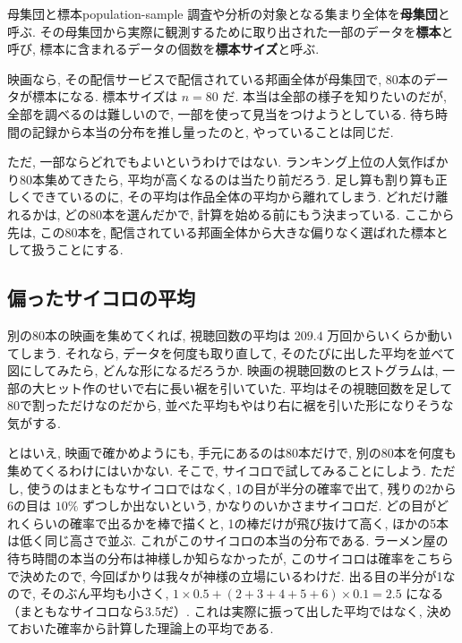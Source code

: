     \begin{defi}{母集団と標本}{population-sample}
      調査や分析の対象となる集まり全体を\textbf{母集団}と呼ぶ.
      その母集団から実際に観測するために取り出された一部のデータを\textbf{標本}と呼び,
      標本に含まれるデータの個数を\textbf{標本サイズ}と呼ぶ.
    \end{defi}

    映画なら, その配信サービスで配信されている邦画全体が母集団で, 80本のデータが標本になる.
    標本サイズは $n = 80$ だ.
    本当は全部の様子を知りたいのだが, 全部を調べるのは難しいので, 一部を使って見当をつけようとしている.
    待ち時間の記録から本当の分布を推し量ったのと, やっていることは同じだ.

    ただ, 一部ならどれでもよいというわけではない.
    ランキング上位の人気作ばかり80本集めてきたら, 平均が高くなるのは当たり前だろう.
    足し算も割り算も正しくできているのに, その平均は作品全体の平均から離れてしまう.
    どれだけ離れるかは, どの80本を選んだかで, 計算を始める前にもう決まっている.
    ここから先は, この80本を, 配信されている邦画全体から大きな偏りなく選ばれた標本として扱うことにする.

  \subsection{偏ったサイコロの平均}

    別の80本の映画を集めてくれば, 視聴回数の平均は $209.4$ 万回からいくらか動いてしまう.
    それなら, データを何度も取り直して, そのたびに出した平均を並べて図にしてみたら, どんな形になるだろうか.
    映画の視聴回数のヒストグラムは, 一部の大ヒット作のせいで右に長い裾を引いていた.
    平均はその視聴回数を足して80で割っただけなのだから, 並べた平均もやはり右に裾を引いた形になりそうな気がする.

    とはいえ, 映画で確かめようにも, 手元にあるのは80本だけで, 別の80本を何度も集めてくるわけにはいかない.
    そこで, サイコロで試してみることにしよう.
    ただし, 使うのはまともなサイコロではなく, 1の目が半分の確率で出て, 残りの2から6の目は $10\%$ ずつしか出ないという, かなりのいかさまサイコロだ.
    どの目がどれくらいの確率で出るかを棒で描くと, 1の棒だけが飛び抜けて高く, ほかの5本は低く同じ高さで並ぶ.
    これがこのサイコロの本当の分布である.
    ラーメン屋の待ち時間の本当の分布は神様しか知らなかったが, このサイコロは確率をこちらで決めたので, 今回ばかりは我々が神様の立場にいるわけだ.
    出る目の半分が1なので, そのぶん平均も小さく, $1\times0.5 + (2+3+4+5+6)\times0.1 = 2.5$ になる（まともなサイコロなら3.5だ）.
    これは実際に振って出した平均ではなく, 決めておいた確率から計算した理論上の平均である.


